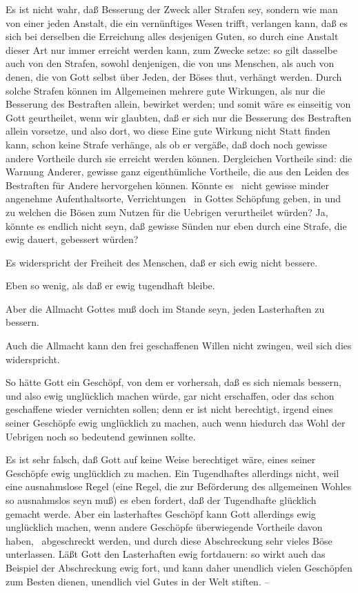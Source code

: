 \begin{aufza}
\begin{aufzb}
\begin{aufzc}
 Es ist nicht wahr, daß Besserung der  Zweck aller Strafen sey, sondern wie man von einer jeden Anstalt, die ein vernünftiges Wesen trifft, verlangen kann, daß es sich bei derselben die Erreichung alles desjenigen Guten, so durch eine Anstalt dieser Art nur immer erreicht werden kann, zum Zwecke setze: so gilt dasselbe auch von den Strafen, sowohl denjenigen, die von uns Menschen, als auch von denen, die von Gott selbst über Jeden, der Böses thut, verhängt werden. Durch solche Strafen können im Allgemeinen mehrere gute Wirkungen, als nur die Besserung des Bestraften allein, bewirket werden; und somit wäre es einseitig von Gott geurtheilet, wenn wir glaubten, daß er sich nur die Besserung des Bestraften allein vorsetze, und also dort, wo diese Eine gute Wirkung nicht Statt finden kann, schon keine Strafe verhänge, als ob er vergäße, daß doch noch gewisse andere Vortheile durch sie erreicht werden können. Dergleichen Vortheile sind: die Warnung Anderer, gewisse ganz eigenthümliche Vortheile, die aus den Leiden des Bestraften für Andere hervorgehen können. Könnte es \zB\ nicht gewisse minder angenehme Aufenthaltsorte, Verrichtungen \udgl\  in Gottes Schöpfung geben, in und zu welchen die Bösen zum Nutzen für die Uebrigen verurtheilet würden? Ja, könnte es endlich nicht seyn, daß gewisse Sünden nur eben durch eine Strafe, die ewig dauert, gebessert würden?
\item {} Es widerspricht der Freiheit des Menschen, daß er sich ewig nicht bessere.\par
{} Eben so wenig, als daß er ewig tugendhaft bleibe.
\item {} Aber die Allmacht Gottes muß doch im Stande seyn, jeden Lasterhaften zu bessern.~\par
{} Auch die Allmacht kann den frei geschaffenen Willen nicht zwingen, weil sich dies widerspricht.
\item {} So hätte Gott ein Geschöpf, von dem er vorhersah, daß es sich niemals bessern, und also ewig unglücklich machen würde, gar nicht erschaffen, oder das schon geschaffene wieder vernichten sollen; denn er ist nicht berechtigt, irgend eines seiner Geschöpfe ewig unglücklich zu machen, auch wenn hiedurch das Wohl der Uebrigen noch so bedeutend gewinnen sollte.\par
{} Es ist sehr falsch, daß Gott auf keine Weise berechtiget wäre, eines seiner Geschöpfe ewig unglücklich zu machen. Ein Tugendhaftes allerdings nicht, weil eine ausnahmslose Regel (eine Regel, die zur Beförderung des allgemeinen Wohles so ausnahmslos seyn muß) es eben fordert, daß der Tugendhafte glücklich gemacht werde. Aber ein lasterhaftes Geschöpf kann Gott allerdings ewig unglücklich machen, wenn andere Geschöpfe überwiegende Vortheile davon haben, \zB\ abgeschreckt werden, und durch diese Abschreckung sehr vieles Böse unterlassen. Läßt Gott den Lasterhaften ewig fortdauern: so wirkt auch das Beispiel der Abschreckung ewig fort, und kann daher unendlich vielen Geschöpfen zum Besten dienen, unendlich viel Gutes in der Welt stiften. --

\end{aufzc}
\end{aufzb}
\end{aufza}
